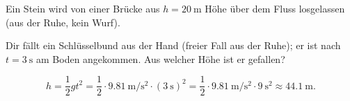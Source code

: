 \documentclass[addpoints,11pt,a4paper]{exam}
\newlength{\antwortraumlen}
\newcommand{\Antwortraum}[1]{%
  \pgfmathsetlength{\antwortraumlen}{#1*2.5cm}%
  \begin{answerbox}
    \rule{0pt}{\antwortraumlen}%
  \end{answerbox}%
}
\begin{document}
\begin{questions}
\begin{taskbox}
\question[6] Ein Stein wird von einer Brücke aus $h=\SI{20}{\meter}$
Höhe über dem Fluss losgelassen (aus der Ruhe, kein Wurf).


\question[4] Dir fällt ein Schlüsselbund aus der Hand (freier Fall aus
der Ruhe); er ist nach $t=\SI{3}{\second}$ am Boden angekommen. Aus
welcher Höhe ist er gefallen?
\Antwortraum{4}
\begin{solution}
\[
  h = \frac{1}{2}gt^2 = \frac{1}{2}\cdot\SI{9.81}{\meter\per\second\squared}\cdot(\SI{3}{\second})^2 = \frac{1}{2}\cdot\SI{9.81}{\meter\per\second\squared}\cdot\SI{9}{\second\squared} \approx \SI{44.1}{\meter}.
\]
\end{solution}
\end{taskbox}
\end{questions}
\end{document}
